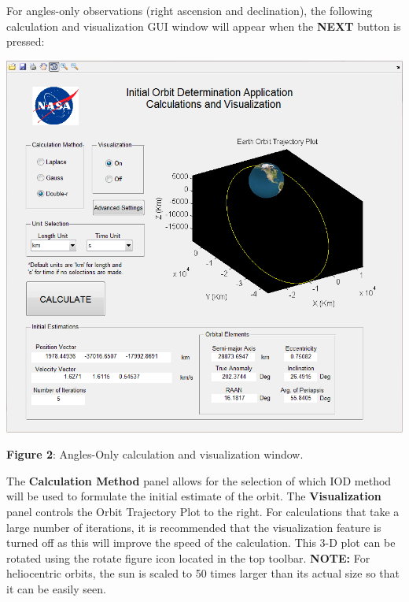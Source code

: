 \documentclass{article}
\begin{document}
                            		\hspace{0.45 cm} For angles-only observations (right ascension and declination), the following calculation and visualization GUI window will appear when the \textbf{NEXT} button is pressed:
			    	\newline
			

			    	\begin{center}
			    	\includegraphics[scale=0.65]{ApplicationAnglesScreenshot.png} \par
			    	\small{\textbf{Figure 2}: Angles-Only calculation and visualization window.} \newline
			    	\end{center}
                            
			    	The \textbf{Calculation Method} panel allows for the selection of which IOD method will be used to formulate the initial estimate of the orbit. The \textbf{Visualization} panel controls the
			    	Orbit Trajectory Plot to the right. For calculations that take a large number of iterations, it is recommended that the visualization feature is turned off as this will improve the speed of the calculation.
			    	This 3-D plot can be rotated using the rotate figure icon located in the top toolbar. \textbf{NOTE:} For heliocentric orbits, the sun is scaled to 50 times larger than its actual size so that it can be easily seen. \par
				
\end{document}
